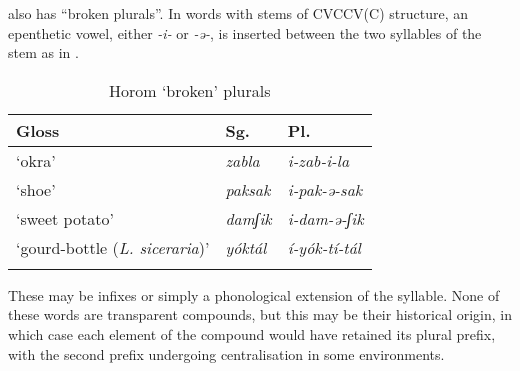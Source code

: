 \documentclass[output=paper]{langsci/langscibook}
\begin{document}
 also has ``broken plurals''. In words with stems of CVCCV(C) structure, an epenthetic vowel, either \textit{-i-} or \textit{-ə-}, is inserted between the two syllables of the stem as in .


\begin{table}
\caption{Horom ‘broken’ plurals}
\label{extab:nomaffplat:48}
\begin{tabularx}{\textwidth}{lXl}
\lsptoprule
Gloss 	& {Sg.} 	& {Pl.}\\
\midrule
‘okra’ 	&  \itshape zabla 	&  \itshape i-zab-i-la\\
‘shoe’ 	&  \itshape paksak 	&  \itshape i-pak-ə-sak\\
‘sweet potato’ 	&  \itshape damʃik 	&  \itshape i-dam-ə-ʃik\\
‘gourd-bottle (\textit{L. siceraria})’ 	&  \itshape yóktál 	&  \itshape í-yók-tí-tál\\
 \lspbottomrule
\end{tabularx}
\end{table}


These may be infixes or simply a phonological extension of the syllable. None of these words are transparent compounds, but this may be their historical origin, in which case each element of the compound would have retained its plural prefix, with the second prefix undergoing centralisation in some environments.
\end{document}
